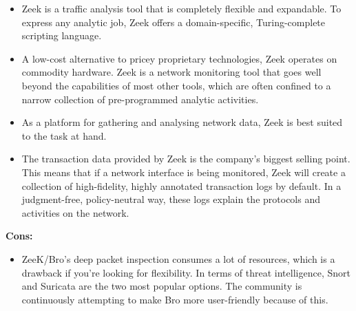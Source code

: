 \documentclass[conference]{IEEEtran}
\begin{document}
\begin{itemize}
    \item Zeek is a traffic analysis tool that is completely flexible and expandable. To express any analytic job, Zeek offers a domain-specific, Turing-complete scripting language.
    \item A low-cost alternative to pricey proprietary technologies, Zeek operates on commodity hardware. Zeek is a network monitoring tool that goes well beyond the capabilities of most other tools, which are often confined to a narrow collection of pre-programmed analytic activities.
    \item As a platform for gathering and analysing network data, Zeek is best suited to the task at hand.
    \item The transaction data provided by Zeek is the company's biggest selling point. This means that if a network interface is being monitored, Zeek will create a collection of high-fidelity, highly annotated transaction logs by default. In a judgment-free, policy-neutral way, these logs explain the protocols and activities on the network.\\

\end{itemize}

{\bfseries{Cons:}}

\begin{itemize}
    \item ZeeK/Bro's deep packet inspection consumes a lot of resources, which is a drawback if you're looking for flexibility. In terms of threat intelligence, Snort and Suricata are the two most popular options. The community is continuously attempting to make Bro more user-friendly because of this.
\end{itemize}


\newpage
\newpage

\newcommand{\noroffcount}[1]{%
\immediate\write18{texcount -v0 -q -total  -sum -merge -q #1.tex > #1-words.noroff }%
}
%
%

\newcommand{\NUCwordcount}[1]{
    \section*{Word count metrics}
    \framebox{%
    \begin{minipage}{0.95\textwidth}
    \textbf{NUC Studio2 Word Count}:\\
    \noroffcount{#1}
    NOTE: References are excluded.
    \end{minipage}}
}

\newpage
\end{document}
